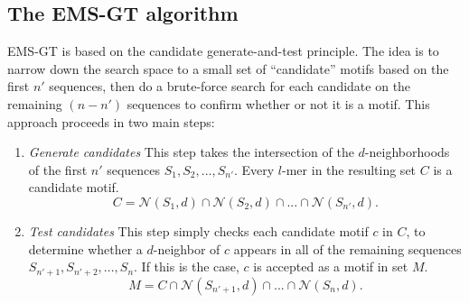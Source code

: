\documentclass{acm_proc_article-sp}
\begin{document}
	\subsection{The EMS-GT algorithm}
		EMS-GT is based on the candidate generate-and-test principle. The idea is to narrow down the search space to a small set of ``candidate'' motifs based on the first $n'$ sequences, then do a brute-force search for each candidate on the remaining $(n - n')$ sequences to confirm whether or not it is a motif. This approach proceeds in two main steps:
		\vspace{-3mm}
		\begin{enumerate} %
			\item {\em Generate candidates}\newline
			This step takes the intersection of the $d$-neighborhoods of the first $n'$ sequences $S_{1},S_{2},...,S_{n'}$. Every $l$-mer in the resulting set $C$ is a candidate motif.\newline
			\vspace{-3mm}
			\begin{equation}
			C = \mathcal{N}(S_{1}, d) \cap \mathcal{N}(S_{2}, d) \cap...\cap \mathcal{N}(S_{n'}, d).
			\end{equation} %
			\item {\em Test candidates}\newline
			This step simply checks each candidate motif $c$ in $C$, to determine whether a $d$-neighbor of $c$ appears in all of the remaining sequences $S_{n'+1},S_{n'+2},...,S_{n}$. If this is the case, $c$ is accepted as a motif in set $M$.\newline
			\vspace{-3mm}
			\begin{equation}
			M = C \cap \mathcal{N}(S_{n'+1}, d) \cap...\cap \mathcal{N}(S_{n}, d).
			\end{equation} %
			\end{enumerate}
		\newpage
\end{document}
